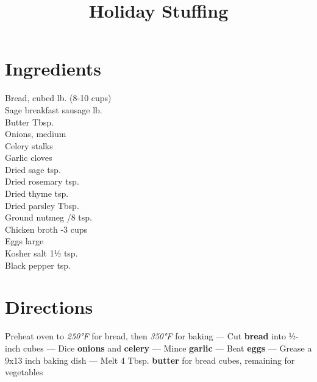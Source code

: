 \documentclass[11pt,letterpaper]{article}
\title{Holiday Stuffing}
\author{}
\date{}
\begin{document}
\maketitle
\thispagestyle{empty}

\section*{Ingredients}
\setlength{\columnsep}{20pt}
\begin{multicols}{2}
\noindent
    Bread, cubed  lb. (8-10 cups) \\
    Sage breakfast sausage  lb. \\
    Butter  Tbsp. \\
    Onions, medium  \\
    Celery stalks  \\
    Garlic cloves  \\
    \columnbreak
    Dried sage  tsp. \\
    Dried rosemary  tsp. \\
    Dried thyme  tsp. \\
    Dried parsley  Tbsp. \\
    Ground nutmeg /8 tsp. \\
    Chicken broth -3 cups \\
    Eggs  large \\
    Kosher salt \dotfill 1½ tsp. \\
    Black pepper  tsp.
\end{multicols}

\section*{Directions}

\noindent
Preheat oven to \textit{250°F} for bread, then \textit{350°F} for baking ---
Cut \textbf{bread} into ½-inch cubes ---
Dice \textbf{onions} and \textbf{celery} ---
Mince \textbf{garlic} ---
Beat \textbf{eggs} ---
Grease a 9x13 inch baking dish ---
Melt 4 Tbsp. \textbf{butter} for bread cubes, remaining for vegetables
\end{document}
